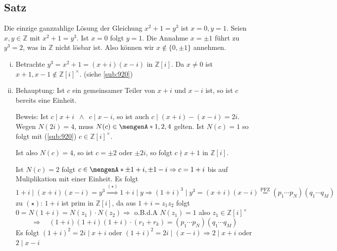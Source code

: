 \subsection[Satz: Lösung von $x^2 +1 = y^3$]{Satz} %
\label{sub:921}
Die einzige ganzzahlige Lösung der Gleichung $x^2 +1 = y^3$ ist $x=0, y= 1$.
Seien $x,y \in \mathds{Z}$ mit $x^2 +1 = y^3$. Ist $x=0$ folgt $y=1$. Die Annahme $x=\pm 1$ führt zu $y^3 = 2$, was in $\mathds{Z}$ nicht lösbar ist. Also können wir 
$x \not\in \{0, \pm 1 \}$ annehmen. \begin{enumerate}[i)]
	\item Betrachte $y^3 = x^2 +1 = (x+i)(x-i)$ in $\mathds{Z}[i]$. Da $x \not= 0$ ist $x+1, x-1 \not\in \mathds{Z}[i]^\times$. (siehe \ref{sub:920})
	\item \label{921:Beh}Behauptung: Ist $c$ ein gemeinsamer Teiler von $x+i$ und $x-i$ ist, so ist $c$ bereits eine Einheit.
	
	Beweis: Ist $c \mid x+i \enspace\wedge \enspace c \mid x-i$, so ist auch $c \mid (x+i)- (x-i) = 2i$. Wegen $N(2i) = 4$, muss $N(c) \in \set{1,2,4}$ gelten. 
	Ist $N(c) = 1$ so folgt mit (\ref{sub:920}) $c \in \mathds{Z}[i]^\times$. 
	\begin{table}[h]
	\end{table}
	Ist also $N(c)=4$, so ist $c = \pm 2$ oder $\pm 2i$, so folgt $c \nmid x+1$ in $\mathds{Z}[i]$. \light
	
	Ist $N(c)=2$ folgt $c \in \set{\pm 1 +i, \pm 1-i} \Rightarrow c= 1+i$ bis auf Muliplikation mit einer Einheit. Es folgt 
	\[
		1+i \mid (x+i)(x-i)= y^3 \stackrel{(\star)}{\Longrightarrow} 1+ i \mid y \Rightarrow (1+i)^3 \mid y^3 = (x+i)(x-i) \stackrel{\text{PFZ}}{=} (p_1 \cdots p_N)(q_1 \cdots q_M)
	\]
	zu $(\star)$: $1+i$ ist prim in $\mathds{Z}[i]$, da aus $1+i = z_1 z_2$ folgt $0=N(1+i)= N(z_1) \cdot N(z_2) \Rightarrow $ o.B.d.A $N(z_1)=1$ 
	also $z_1 \in \mathds{Z}[i]^\times$
	\[
		\Longrightarrow \quad (1+i)(1+i)(1+i) \cdot( r_1 + r_k) = (p_1 \cdots p_N)(q_1 \cdots q_M)
	\]
	Es folgt $(1+i)^2 = 2i \mid x+i$ oder $(1+i)^2  = 2i\mid (x-i) \Rightarrow  2 \mid x+i$ oder $2 \mid x-i$ \light
	

\end{enumerate}
